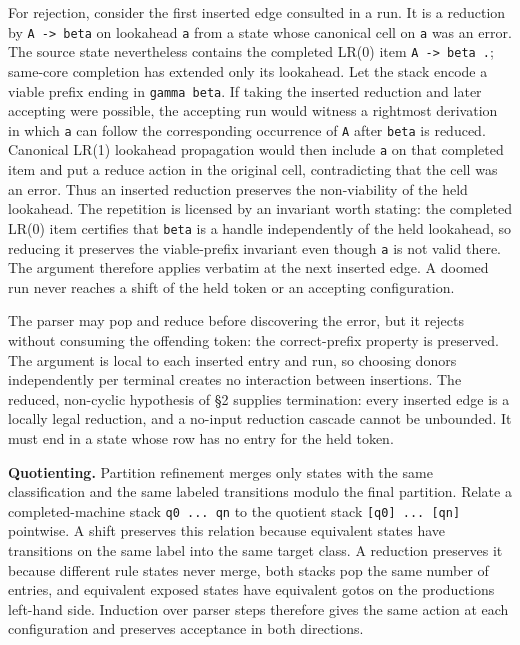 \documentclass[
  10pt,
]{article}
\begin{document}
For rejection, consider the first inserted edge consulted in a run. It
is a reduction by \texttt{A\ -\textgreater{}\ beta} on lookahead
\texttt{a} from a state whose canonical cell on \texttt{a} was an error.
The source state nevertheless contains the completed LR(0) item
\texttt{A\ -\textgreater{}\ beta\ .}; same-core completion has extended
only its lookahead. Let the stack encode a viable prefix ending in
\texttt{gamma\ beta}. If taking the inserted reduction and later
accepting were possible, the accepting run would witness a rightmost
derivation in which \texttt{a} can follow the corresponding occurrence
of \texttt{A} after \texttt{beta} is reduced. Canonical LR(1) lookahead
propagation would then include \texttt{a} on that completed item and put
a reduce action in the original cell, contradicting that the cell was an
error. Thus an inserted reduction preserves the non-viability of the
held lookahead. The repetition is licensed by an invariant worth
stating: the completed LR(0) item certifies that \texttt{beta} is a
handle independently of the held lookahead, so reducing it preserves the
viable-prefix invariant even though \texttt{a} is not valid there. The
argument therefore applies verbatim at the next inserted edge. A doomed
run never reaches a shift of the held token or an accepting
configuration.

The parser may pop and reduce before discovering the error, but it
rejects without consuming the offending token: the correct-prefix
property is preserved. The argument is local to each inserted entry and
run, so choosing donors independently per terminal creates no
interaction between insertions. The reduced, non-cyclic hypothesis of §2
supplies termination: every inserted edge is a locally legal reduction,
and a no-input reduction cascade cannot be unbounded. It must end in a
state whose row has no entry for the held token.

\textbf{Quotienting.} Partition refinement merges only states with the
same classification and the same labeled transitions modulo the final
partition. Relate a completed-machine stack \texttt{q0\ ...\ qn} to the
quotient stack \texttt{{[}q0{]}\ ...\ {[}qn{]}} pointwise. A shift
preserves this relation because equivalent states have transitions on
the same label into the same target class. A reduction preserves it
because different rule states never merge, both stacks pop the same
number of entries, and equivalent exposed states have equivalent gotos
on the production\textquotesingle s left-hand side. Induction over
parser steps therefore gives the same action at each configuration and
preserves acceptance in both directions.
\end{document}
